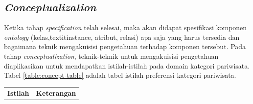 \subsection{\textit{Conceptualization}}
Ketika tahap \textit{specification} telah selesai, maka akan didapat spesifikasi komponen \textit{ontology} (kelas,textit{instance}, atribut, relasi) apa saja yang harus tersedia dan bagaimana
teknik mengakuisisi pengetahuan terhadap komponen tersebut. Pada tahap \textit{conceptualization}, teknik-teknik untuk mengakuisisi pengetahuan diaplikasikan
untuk mendapatkan istilah-istilah pada domain kategori pariwisata. Tabel \ref{table:concept-table} adalah tabel istilah preferensi kategori pariwisata.

\begin{center}
\begin{longtable}{ |l|m{10cm}| } 
\hline
	\textbf{Istilah} & \textbf{Keterangan} \\
	

\end{longtable}
\end{center}
